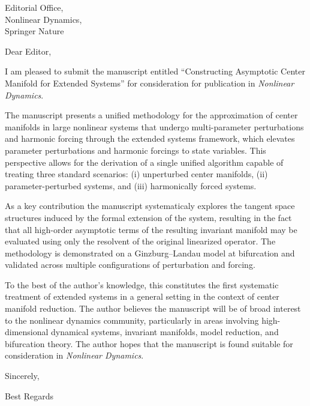 \documentclass[]{letter}
\begin{document}

\begin{letter}{Editorial Office,\\Nonlinear Dynamics,\\Springer Nature}

\address{Okinawa Institute of Science and Technology,\\ Graduate University, \\Onna, Okinawa 904-0495, Japan}

\opening{Dear Editor,}

I am pleased to submit the manuscript entitled ``Constructing Asymptotic Center Manifold for Extended Systems'' for consideration for publication in \emph{Nonlinear Dynamics}.

The manuscript presents a unified methodology for the approximation of center manifolds in large nonlinear systems that undergo multi-parameter perturbations and harmonic forcing through the extended systems framework, which elevates parameter perturbations and harmonic forcings to state variables. This perspective allows for the derivation of a single unified algorithm capable of treating three standard scenarios: (i) unperturbed center manifolds, (ii) parameter-perturbed systems, and (iii) harmonically forced systems.

As a key contribution the manuscript systematicaly explores the tangent space structures induced by the formal extension of the system, resulting in the fact that all high-order asymptotic terms of the resulting invariant manifold may be evaluated using only the resolvent of the original linearized operator. The methodology is demonstrated on a Ginzburg–Landau model at bifurcation and validated across multiple configurations of perturbation and forcing.

To the best of the author's knowledge, this constitutes the first systematic treatment of extended systems in a general setting in the context of center manifold reduction. The author believes the manuscript will be of broad interest to the nonlinear dynamics community, particularly in areas involving high-dimensional dynamical systems, invariant manifolds, model reduction, and bifurcation theory. The author hopes that the manuscript is found suitable for consideration in \emph{Nonlinear Dynamics}. 

Sincerely,


\signature{Prabal S. Negi}

\closing{Best Regards}


\end{letter}
\end{document}
